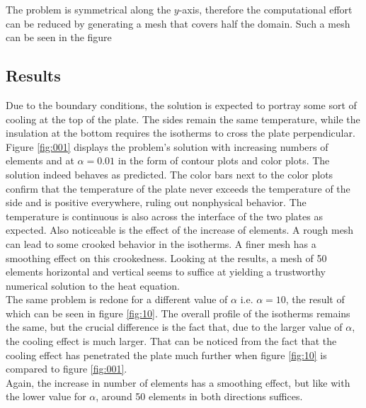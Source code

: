 \documentclass[10pt,a4paper]{article}
\begin{document}
The problem is symmetrical along the $y$-axis, therefore the computational effort can be reduced by generating a mesh that covers half the domain. Such a mesh can be seen in the figure %
\subsection{Results}
Due to the boundary conditions, the solution is expected to portray some sort of cooling at the top of the plate. The sides remain the same temperature, while the insulation at the bottom requires the isotherms to cross the plate perpendicular. \\


Figure \ref{fig:001} displays the problem's solution with increasing numbers of elements and at $\alpha = 0.01$ in the form of contour plots and color plots. The solution indeed behaves as predicted. The color bars next to the color plots confirm that the temperature of the plate never exceeds the temperature of the side and is positive everywhere, ruling out nonphysical behavior. The temperature is continuous is also across the interface of the two plates as expected.
Also noticeable is the effect of the increase of elements. A rough mesh can lead to some crooked behavior in the isotherms. A finer mesh has a smoothing effect on this crookedness. Looking at the results, a mesh of 50 elements horizontal and vertical seems to suffice at yielding a trustworthy numerical solution to the heat equation.\\

The same problem is redone for a different value of $\alpha$ i.e. $\alpha = 10$, the result of which can be seen in figure \ref{fig:10}. The overall profile of the isotherms remains the same, but the crucial difference is the fact that, due to the larger value of $\alpha$, the cooling effect is much larger. That can be noticed from the fact that the cooling effect has penetrated the plate much further when figure \ref{fig:10} is compared to figure \ref{fig:001}.\\
Again, the increase in number of elements has a smoothing effect, but like with the lower value for $\alpha$, around 50 elements in both directions suffices.
\end{document}

